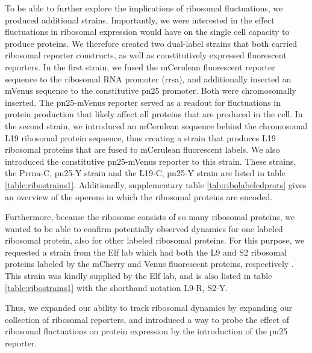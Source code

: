 To be able to further explore the implications of ribosomal fluctuations, 
we produced additional strains.
%
Importantly, we were interested in the effect fluctuations in ribosomal expression would have on 
the single cell capacity to produce proteins.
%
We therefore created two dual-label strains that both carried ribosomal reporter constructs, as well as constitutively expressed fluorescent reporters.
%
In the first strain, we fused the mCerulean fluorescent reporter sequence to the ribosomal RNA promoter (rrsa), and additionally inserted an mVenus sequence to the constitutive pn25 promoter. Both were chromosomally inserted.
%
The pn25-mVenus reporter served as a readout for fluctuations in protein production that likely affect all proteins that are produced in the cell. 
%
In the second strain, we introduced an mCerulean sequence behind the chromosomal L19 ribosomal protein sequence, thus creating a strain that produces L19 ribosomal proteins that are fused to mCerulean fluorescent labels.
We also introduced the constitutive pn25-mVenus reporter to this strain.
%
These strains, the Prrna-C, pn25-Y strain and the L19-C, pn25-Y strain are listed in table \ref{table:ribostrains1}.
Additionally, supplementary table \ref{tab:ribolabeledprots} gives an overview of the operons in which the ribosomal proteins are encoded.

Furthermore, because the ribosome consists of so many ribosomal proteins, we wanted to be able to confirm 
potentially observed dynamics for one labeled ribosomal protein, also for other labeled ribosomal proteins.
%
For this purpose, we requested a strain from the Elf lab which had both the L9 and S2 ribosomal proteins labeled by the mCherry and Venus fluorescent proteins, respectively \cite{Wallden2016}.
This strain was kindly supplied by the Elf lab, and is also listed in table \ref{table:ribostrains1} with the shorthand notation L9-R, S2-Y.

Thus, we expanded our ability to track ribosomal dynamics by 
expanding our collection of ribosomal reporters, 
and introduced a way to probe the effect of ribosomal fluctuations on protein expression by the introduction of the pn25 reporter.


